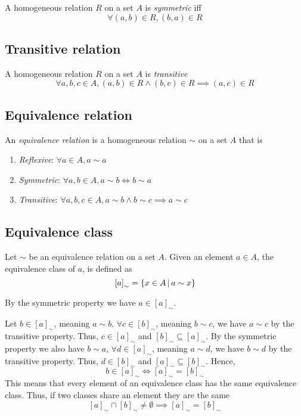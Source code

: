 \documentclass{article}
\begin{document}
A homogeneous relation \(R\) on a set \(A\) is \textit{symmetric}
iff
\[
    \forall (a,b) \in R, (b,a) \in R
\]

\subsection{Transitive relation}

A homogeneous relation \(R\) on a set \(A\) is \textit{transitive}
\[
    \forall a,b,c \in A, (a,b) \in R \land (b,c) \in R \implies (a,c) \in R 
\]

\subsection{Equivalence relation}

An \textit{equivalence relation} is a homogeneous relation \(\sim\) on a set \(A\)
that is
\begin{enumerate}
    \item \textit{Reflexive}: \(\forall a \in A, a \sim a\)
    \item \textit{Symmetric}: \(\forall a,b \in A, a \sim b \iff b \sim a\)
    \item \textit{Transitive}: \(\forall a,b,c \in A, a \sim b \land b \sim c \implies a \sim c\)
\end{enumerate}

\subsection{Equivalence class}

Let \(\sim\) be an equivalence relation on a set \(A\).
Given an element \(a\in A\), the equivalence class of \(a\), is defined as
\[
    {[a]}_{\sim} = \{x \in A \,|\, a \sim x\}
\]

By the symmetric property we have \(a \in {[a]}_{\sim}\).

Let \(b \in {[a]}_{\sim}\), meaning \(a \sim b\). \(\forall c \in {[b]}_{\sim}\),
meaning \(b \sim c\), we have \(a \sim c\) by the transitive property.
Thus, \(c \in {[a]}_{\sim}\) and \({[b]}_{\sim} \subseteq {[a]}_{\sim}\).
By the symmetric property we also have \(b \sim a\),
\(\forall d \in {[a]}_{\sim}\), meaning \(a \sim d\), we have
\(b \sim d\) by the transitive property. Thus, \(d \in {[b]}_{\sim}\)
and \({[a]}_{\sim} \subseteq {[b]}_{\sim}\). Hence,
\[
    b \in {[a]}_{\sim} \iff {[a]}_{\sim} = {[b]}_{\sim}
\]
This means that every element of an equivalence class has the same equivalence class.
Thus, if two classes share an element they are the same
\[
    {[a]}_{\sim} \cap {[b]}_{\sim} \neq \emptyset
    \implies {[a]}_{\sim} = {[b]}_{\sim}
\]
\end{document}
